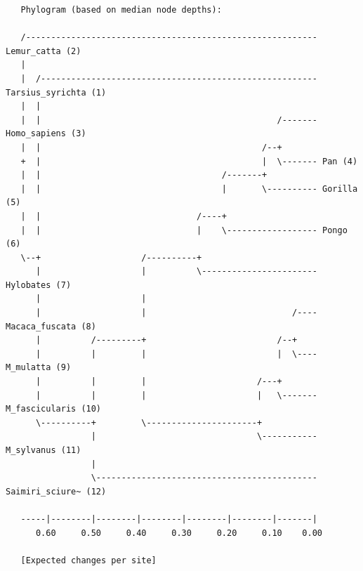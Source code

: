 \documentclass[12pt]{book}
\begin{document}
\scriptsize
\begin{singlespacing}
\begin{verbatim}
   Phylogram (based on median node depths):

   /---------------------------------------------------------- Lemur_catta (2)
   |                                                                               
   |  /------------------------------------------------------- Tarsius_syrichta (1)
   |  |                                                                            
   |  |                                               /------- Homo_sapiens (3)
   |  |                                            /--+                            
   +  |                                            |  \------- Pan (4)
   |  |                                    /-------+                               
   |  |                                    |       \---------- Gorilla (5)
   |  |                               /----+                                       
   |  |                               |    \------------------ Pongo (6)
   \--+                    /----------+                                            
      |                    |          \----------------------- Hylobates (7)
      |                    |                                                       
      |                    |                             /---- Macaca_fuscata (8)
      |          /---------+                          /--+                         
      |          |         |                          |  \---- M_mulatta (9)
      |          |         |                      /---+                            
      |          |         |                      |   \------- M_fascicularis (10)
      \----------+         \----------------------+                                
                 |                                \----------- M_sylvanus (11)
                 |                                                                 
                 \-------------------------------------------- Saimiri_sciure~ (12)
                                                                                   
   -----|--------|--------|--------|--------|--------|-------|                     
      0.60     0.50     0.40     0.30     0.20     0.10    0.00                    

   [Expected changes per site]
\end{verbatim}
\end{singlespacing}
\normalsize
\end{document}
